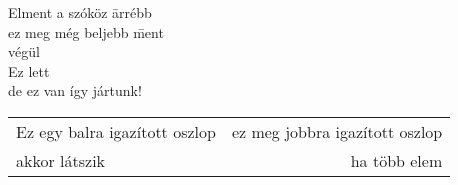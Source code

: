 \documentclass[a4paper]{article}
\begin{document}
\begin{tabbing}
Elment a szóköz \= arrébb\\
\> ez meg még beljebb \= ment\\
\> \> végül \\
Ez lett \=\\
\> de ez van \> így jártunk!
\end{tabbing}

\begin{tabular}{|l|r|}
Ez egy balra igazított oszlop & ez meg jobbra igazított oszlop
\\
akkor látszik & ha több elem
\end{tabular}
\end{document}
